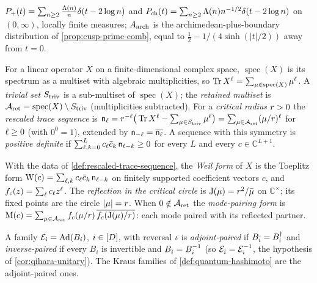 \begin{definition}
\label{def:prime-measures}
$P_{+}(t) = \sum_{n\ge2}\frac{\Lambda(n)}{n}\delta(t-2\log n)$ and
$P_{\mathrm{ch}}(t) = \sum_{n\ge2}\Lambda(n)n^{-1/2}\delta(t-2\log n)$ on $(0,\infty)$,
locally finite measures; $A_{\mathrm{arch}}$ is the archimedean-plus-boundary
distribution of \cref{prop:cusp-prime-comb}, equal to
$\tfrac12 - 1/(4\sinh(|t|/2))$ away from $t = 0$.
\end{definition}

\begin{definition}
\label{def:rescaled-trace-sequence}
For a linear operator $X$ on a finite-dimensional complex space, $\operatorname{spec}(X)$ is
its spectrum as a multiset with algebraic multiplicities, so $\operatorname{Tr} X^{\ell} =
\sum_{\mu\in\operatorname{spec}(X)}\mu^{\ell}$. A \emph{trivial set} $S_{\mathrm{triv}}$ is a
sub-multiset of $\operatorname{spec}(X)$; the \emph{retained multiset} is $\mathcal A_{\mathrm{ret}} =
\operatorname{spec}(X)\setminus S_{\mathrm{triv}}$ (multiplicities subtracted). For a \emph{critical
radius} $r>0$ the \emph{rescaled trace sequence} is
$\mathsf n_{\ell} = r^{-\ell}\big(\operatorname{Tr} X^{\ell} - \sum_{\mu\in S_{\mathrm{triv}}}\mu^{\ell}\big)
= \sum_{\mu\in\mathcal A_{\mathrm{ret}}}(\mu/r)^{\ell}$ for $\ell\ge0$ (with $0^0 = 1$), extended
by $\mathsf n_{-\ell} = \overline{\mathsf n_{\ell}}$. A sequence with this symmetry is
\emph{positive definite} if $\sum_{\ell,k=0}^{L}c_{\ell}\bar c_k\,\mathsf n_{\ell-k}\ge0$ for
every $L$ and every $c\in\mathbb C^{L+1}$.
\end{definition}

\begin{definition}
\label{def:weil-form}
With the data of \cref{def:rescaled-trace-sequence}, the \emph{Weil form} of $X$ is the
Toeplitz form $\mathrm{W}(c) = \sum_{\ell,k}c_{\ell}\bar c_k\,\mathsf n_{\ell-k}$ on finitely supported
coefficient vectors $c$, and $f_{c}(z) = \sum_{\ell}c_{\ell}z^{\ell}$. The
\emph{reflection in the critical circle} is $\mathrm{J}(\mu) = r^2/\bar{\mu}$ on
$\mathbb C^\times$; its fixed points are the circle $|\mu| = r$. When $0\notin\mathcal A_{\mathrm{ret}}$
the \emph{mode-pairing form} is $\mathrm{M}(c) = \sum_{\mu\in\mathcal A_{\mathrm{ret}}}
f_{c}(\mu/r)\,\overline{f_{c}(\mathrm{J}(\mu)/r)}$: each mode paired
with its reflected partner.
\end{definition}

\begin{definition}
\label{def:kraus-pairings}
A family $\mathcal E_{i} = \operatorname{Ad}(B_i)$, $i\in[D]$, with reversal $\iota$ is \emph{adjoint-paired}
if $B_{\bar{i}} = B_i^\dagger$ and \emph{inverse-paired} if every $B_i$ is invertible and
$B_{\bar{i}} = B_i^{-1}$ (so $\mathcal E_{\bar{i}} = \mathcal E_{i}^{-1}$, the hypothesis of
\cref{cor:qihara-unitary}). The Kraus families of \cref{def:quantum-hashimoto} are the
adjoint-paired ones.
\end{definition}

